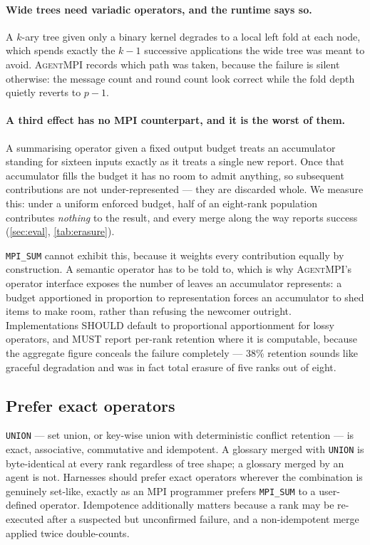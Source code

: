 \documentclass[10pt,twocolumn]{article}
\theoremstyle{definition}
\theoremstyle{plain}
\newcommand{\ampi}{\textsc{AgentMPI}}
\newcommand{\code}[1]{\texttt{\small #1}}
\begin{document}
\paragraph{Wide trees need variadic operators, and the runtime says so.} A $k$-ary
tree given only a binary kernel degrades to a local left fold at each node, which
spends exactly the $k-1$ successive applications the wide tree was meant to avoid.
\ampi{} records which path was taken, because the failure is silent otherwise: the
message count and round count look correct while the fold depth quietly reverts to
$p-1$.

\paragraph{A third effect has no MPI counterpart, and it is the worst of them.} A
summarising operator given a fixed output budget treats an accumulator standing for
sixteen inputs exactly as it treats a single new report. Once that accumulator fills the
budget it has no room to admit anything, so subsequent contributions are not
under-represented --- they are discarded whole. We measure this: under a uniform enforced
budget, half of an eight-rank population contributes \emph{nothing} to the result, and
every merge along the way reports success (\cref{sec:eval}, \cref{tab:erasure}).

\code{MPI\_SUM} cannot exhibit this, because it weights every contribution equally by
construction. A semantic operator has to be told to, which is why \ampi{}'s operator
interface exposes the number of leaves an accumulator represents: a budget apportioned in
proportion to representation forces an accumulator to shed items to make room, rather than
refusing the newcomer outright. Implementations SHOULD default to proportional
apportionment for lossy operators, and MUST report per-rank retention where it is
computable, because the aggregate figure conceals the failure completely --- 38\% retention
sounds like graceful degradation and was in fact total erasure of five ranks out of eight.

\subsection{Prefer exact operators}

\code{UNION} --- set union, or key-wise union with deterministic conflict retention
--- is exact, associative, commutative and idempotent. A glossary merged with
\code{UNION} is byte-identical at every rank regardless of tree shape; a glossary
merged by an agent is not. Harnesses should prefer exact operators wherever the
combination is genuinely set-like, exactly as an MPI programmer prefers
\code{MPI\_SUM} to a user-defined operator. Idempotence additionally matters
because a rank may be re-executed after a suspected but unconfirmed failure, and a
non-idempotent merge applied twice double-counts.
\end{document}
